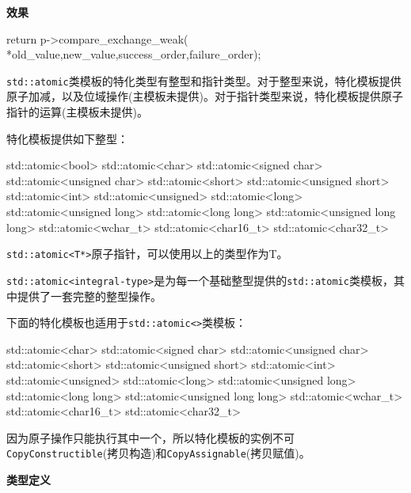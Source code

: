 \textbf{效果}

\begin{cpp}
return p->compare_exchange_weak(
   *old_value,new_value,success_order,failure_order);
\end{cpp}


\texttt{std::atomic}类模板的特化类型有整型和指针类型。对于整型来说，特化模板提供原子加减，以及位域操作(主模板未提供)。对于指针类型来说，特化模板提供原子指针的运算(主模板未提供)。

特化模板提供如下整型：

\begin{cpp}
std::atomic<bool>
std::atomic<char>
std::atomic<signed char>
std::atomic<unsigned char>
std::atomic<short>
std::atomic<unsigned short>
std::atomic<int>
std::atomic<unsigned>
std::atomic<long>
std::atomic<unsigned long>
std::atomic<long long>
std::atomic<unsigned long long>
std::atomic<wchar_t>
std::atomic<char16_t>
std::atomic<char32_t>
\end{cpp}

\texttt{std::atomic<T*>}原子指针，可以使用以上的类型作为T。


\texttt{std::atomic<integral-type>}是为每一个基础整型提供的\texttt{std::atomic}类模板，其中提供了一套完整的整型操作。

下面的特化模板也适用于\texttt{std::atomic<>}类模板：

\begin{cpp}
std::atomic<char>
std::atomic<signed char>
std::atomic<unsigned char>
std::atomic<short>
std::atomic<unsigned short>
std::atomic<int>
std::atomic<unsigned>
std::atomic<long>
std::atomic<unsigned long>
std::atomic<long long>
std::atomic<unsigned long long>
std::atomic<wchar_t>
std::atomic<char16_t>
std::atomic<char32_t>
\end{cpp}

因为原子操作只能执行其中一个，所以特化模板的实例不可\texttt{CopyConstructible}(拷贝构造)和\texttt{CopyAssignable}(拷贝赋值)。

\textbf{类型定义}

